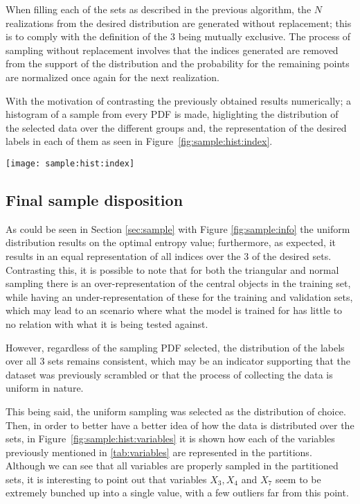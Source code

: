 \documentclass[journal]{IEEEtran}
\begin{document}
When filling each of the sets as described in the previous algorithm, the $N$
realizations from the desired distribution are generated without replacement;
this is to comply with the definition of the $3$ being mutually exclusive. The
process of sampling without replacement involves that the indices generated are
removed from the support of the distribution and the probability for the
remaining points are normalized once again for the next realization.

With the motivation of contrasting the previously obtained results numerically;
a histogram of a sample from every PDF is made, higlighting the distribution of
the selected data over the different groups and, the representation of the
desired labels in each of them as seen in Figure~\ref{fig:sample:hist:index}.

\begin{figure*}[ht]
    \texttt{[image: sample:hist:index]}
    \caption{Distribution of indices over data sets. \label{fig:sample:hist:index}}
\end{figure*}


\subsection{Final sample disposition\label{sec:sample:final}}

As could be seen in Section \ref{sec:sample} with Figure \ref{fig:sample:info}
the uniform distribution results on the optimal entropy value; furthermore, as
expected, it results in an equal representation of all indices over the $3$ of
the desired sets. Contrasting this, it is possible to note that for both the
triangular and normal sampling there is an over-representation of the central
objects in the training set, while having an under-representation of these for
the training and validation sets, which may lead to an scenario where what the
model is trained for has little to no relation with what it is being tested
against.

However, regardless of the sampling PDF selected, the distribution of the labels
over all $3$ sets remains consistent, which may be an indicator supporting that the
dataset was previously scrambled or that the process of collecting the data is
uniform in nature.

This being said, the uniform sampling was selected as the distribution of
choice. Then, in order to better have a better idea of how the data is
distributed over the sets, in Figure~\ref{fig:sample:hist:variables} it is shown
how each of the variables previously mentioned in \ref{tab:variables} are
represented in the partitions. Although we can see that all variables are
properly sampled in the partitioned sets, it is interesting to point out that
variables $X_3, X_4$ and $X_7$ seem to be extremely bunched up into a single
value, with a few outliers far from this point. 
\end{document}
